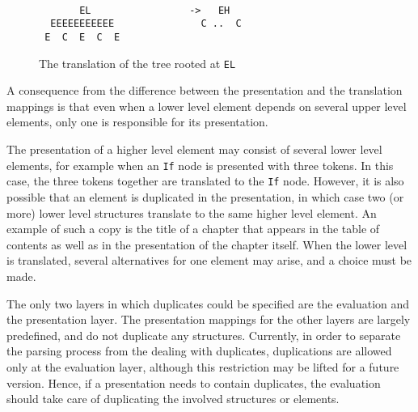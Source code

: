 \begin{figure}
\begin{center}
\begin{center}
\begin{verbatim}

       EL                 ->   EH
  EEEEEEEEEEE               C ..  C
 E  C  E  C  E

\end{verbatim}
\end{center}
\caption{The translation of the tree rooted at {\tt EL}}\label{elementTranslation} 
\end{center}
\end{figure}

%
%

A consequence from the difference between the presentation and the translation mappings is that even when a lower level element depends on several upper level elements, only one is responsible for its presentation.  




The presentation of a higher level element may consist of several lower level elements, for example when an \verb|If| node is presented with three tokens. In this case, the three tokens together are translated to the \verb|If| node. However, it is also possible that an element is duplicated in the presentation, in which case two (or more) lower level structures  translate to the same higher level element. An example of such a copy is the title of a chapter that appears in the table of contents as well as in the presentation of the chapter itself. When the lower level is translated, several alternatives for one element may arise, and a choice must be made. 

The only two layers in which duplicates could be specified are the evaluation and the presentation layer. The presentation mappings for the other layers are largely predefined, and do not duplicate any structures. Currently, in order to separate the parsing process from the dealing with duplicates, duplications are allowed only at the evaluation layer, although this restriction may be lifted for a future version. Hence, if a presentation needs to contain duplicates, the evaluation should take care of duplicating the involved structures or elements.

